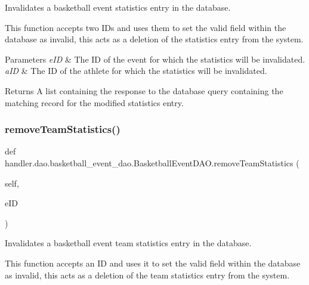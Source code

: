 Invalidates a basketball event statistics entry in the database. 

This function accepts two I\+Ds and uses them to set the valid field within the database as invalid, this acts as a deletion of the statistics entry from the system.


\begin{DoxyParams}{Parameters}
{\em e\+ID} & The ID of the event for which the statistics will be invalidated. \\
\hline
{\em a\+ID} & The ID of the athlete for which the statistics will be invalidated.\\
\hline
\end{DoxyParams}
\begin{DoxyReturn}{Returns}
A list containing the response to the database query containing the matching record for the modified statistics entry. 
\end{DoxyReturn}
\mbox{\label{classhandler_1_1dao_1_1basketball__event__dao_1_1_basketball_event_d_a_o_a53a9c4458e7f34993801713a0d8e622b}} 
\subsubsection{\texorpdfstring{remove\+Team\+Statistics()}{removeTeamStatistics()}}
{\footnotesize\ttfamily def handler.\+dao.\+basketball\+\_\+event\+\_\+dao.\+Basketball\+Event\+D\+A\+O.\+remove\+Team\+Statistics (\begin{DoxyParamCaption}\item[{}]{self,  }\item[{}]{e\+ID }\end{DoxyParamCaption})}



Invalidates a basketball event team statistics entry in the database. 

This function accepts an ID and uses it to set the valid field within the database as invalid, this acts as a deletion of the team statistics entry from the system.


